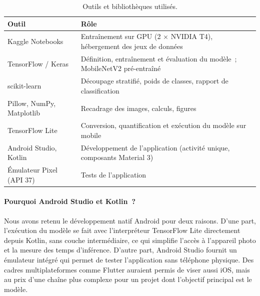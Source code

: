 \begin{table}[H]
\centering
\caption{Outils et bibliothèques utilisés.}\label{tab:outils}
\small
\begin{tabular}{@{}p{4.2cm}p{9.6cm}@{}}
\toprule
\textbf{Outil} & \textbf{Rôle} \\
\midrule
Kaggle Notebooks & Entraînement sur GPU (2 $\times$ NVIDIA T4), hébergement des jeux de données \\
TensorFlow / Keras & Définition, entraînement et évaluation du modèle~; MobileNetV2 pré-entraîné \\
scikit-learn & Découpage stratifié, poids de classes, rapport de classification \\
Pillow, NumPy, Matplotlib & Recadrage des images, calculs, figures \\
TensorFlow Lite & Conversion, quantification et exécution du modèle sur mobile \\
Android Studio, Kotlin & Développement de l’application (activité unique, composants Material 3) \\
Émulateur Pixel (API 37) & Tests de l’application \\
\bottomrule
\end{tabular}
\end{table}

\paragraph{Pourquoi Android Studio et Kotlin~?} Nous avons retenu le développement natif Android pour deux raisons. D’une part, l’exécution du modèle se fait avec l’interpréteur TensorFlow Lite directement depuis Kotlin, sans couche intermédiaire, ce qui simplifie l’accès à l’appareil photo et la mesure des temps d’inférence. D’autre part, Android Studio fournit un émulateur intégré qui permet de tester l’application sans téléphone physique. Des cadres multiplateformes comme Flutter auraient permis de viser aussi iOS, mais au prix d’une chaîne plus complexe pour un projet dont l’objectif principal est le modèle.
